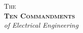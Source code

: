 {\fontsize{28}{32}\selectfont\scshape\color{muted} The}\\[1mm]
{\fontsize{96}{98}\selectfont\bfseries\scshape Ten Commandments}\\[4mm]
{\fontsize{42}{48}\selectfont\itshape of Electrical Engineering}%
